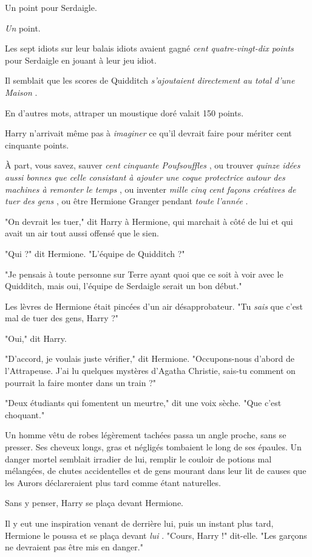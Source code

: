 Un point pour Serdaigle.

\emph{Un}  point.

Les sept idiots sur leur balais idiots avaient gagné \emph{cent quatre-vingt-dix points}  pour Serdaigle en jouant à leur jeu idiot.

Il semblait que les scores de Quidditch \emph{s'ajoutaient directement au total d'une Maison} .

En d'autres mots, attraper un moustique doré valait 150 points.

Harry n'arrivait même pas à \emph{imaginer}  ce qu'il devrait faire pour mériter cent cinquante points.

À part, vous savez, sauver \emph{cent cinquante Poufsouffles} , ou trouver \emph{quinze idées aussi bonnes que celle consistant à ajouter une coque protectrice autour des machines à remonter le temps} , ou inventer \emph{mille cinq cent façons créatives de tuer des gens} , ou être Hermione Granger pendant \emph{toute l'année} .

"On devrait les tuer," dit Harry à Hermione, qui marchait à côté de lui et qui avait un air tout aussi offensé que le sien.

"Qui ?" dit Hermione. "L'équipe de Quidditch ?"

"Je pensais à toute personne sur Terre ayant quoi que ce soit à voir avec le Quidditch, mais oui, l'équipe de Serdaigle serait un bon début."

Les lèvres de Hermione était pincées d'un air désapprobateur. "Tu \emph{sais}  que c'est mal de tuer des gens, Harry ?"

"Oui," dit Harry.

"D'accord, je voulais juste vérifier," dit Hermione. "Occupons-nous d'abord de l'Attrapeuse. J'ai lu quelques mystères d'Agatha Christie, sais-tu comment on pourrait la faire monter dans un train ?"

"Deux étudiants qui fomentent un meurtre," dit une voix sèche. "Que c'est choquant."

Un homme vêtu de robes légèrement tachées passa un angle proche, sans se presser. Ses cheveux longs, gras et négligés tombaient le long de ses épaules. Un danger mortel semblait irradier de lui, remplir le couloir de potions mal mélangées, de chutes accidentelles et de gens mourant dans leur lit de causes que les Aurors déclareraient plus tard comme étant naturelles.

Sans y penser, Harry se plaça devant Hermione.

Il y eut une inspiration venant de derrière lui, puis un instant plus tard, Hermione le poussa et se plaça devant \emph{lui} . "Cours, Harry !" dit-elle. "Les garçons ne devraient pas être mis en danger."

